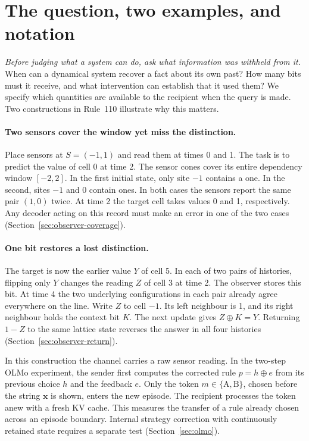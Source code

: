 \section{The question, two examples, and notation}
\emph{Before judging what a system can do, ask what information was withheld from it.}
When can a dynamical system recover a fact about its own past? How many bits must it receive, and what intervention can establish that it used them? We specify which quantities are available to the recipient when the query is made. Two constructions in Rule~110 illustrate why this matters.

\paragraph{Two sensors cover the window yet miss the distinction.}
Place sensors at $S=(-1,1)$ and read them at times 0 and 1. The task is to predict the value of cell 0 at time 2. The sensor cones cover its entire dependency window $[-2,2]$. In the first initial state, only site $-1$ contains a one. In the second, sites $-1$ and $0$ contain ones. In both cases the sensors report the same pair $(1,0)$ twice. At time 2 the target cell takes values 0 and 1, respectively. Any decoder acting on this record must make an error in one of the two cases (Section~\ref{sec:observer-coverage}).

\paragraph{One bit restores a lost distinction.}
The target is now the earlier value $Y$ of cell 5. In each of two pairs of histories, flipping only $Y$ changes the reading $Z$ of cell 3 at time 2. The observer stores this bit. At time 4 the two underlying configurations in each pair already agree everywhere on the line. Write $Z$ to cell $-1$. Its left neighbour is 1, and its right neighbour holds the context bit $K$. The next update gives $Z\oplus K=Y$. Returning $1-Z$ to the same lattice state reverses the answer in all four histories (Section~\ref{sec:observer-return}).

In this construction the channel carries a raw sensor reading. In the two-step OLMo experiment, the sender first computes the corrected rule $p=h\oplus e$ from its previous choice $h$ and the feedback $e$. Only the token $m\in\{\mathrm{A},\mathrm{B}\}$, chosen before the string $\mathbf{x}$ is shown, enters the new episode. The recipient processes the token anew with a fresh KV cache. This measures the transfer of a rule already chosen across an episode boundary. Internal strategy correction with continuously retained state requires a separate test (Section~\ref{sec:olmo}).

